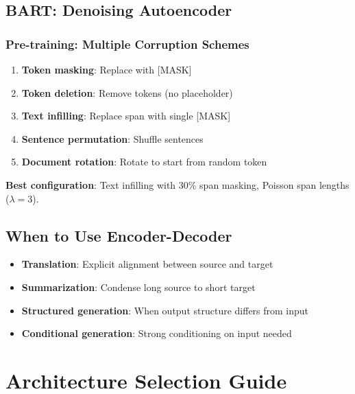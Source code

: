 \subsection{BART: Denoising Autoencoder}

\subsubsection{Pre-training: Multiple Corruption Schemes}

\begin{enumerate}
    \item \textbf{Token masking}: Replace with [MASK]
    \item \textbf{Token deletion}: Remove tokens (no placeholder)
    \item \textbf{Text infilling}: Replace span with single [MASK]
    \item \textbf{Sentence permutation}: Shuffle sentences
    \item \textbf{Document rotation}: Rotate to start from random token
\end{enumerate}

\textbf{Best configuration}: Text infilling with 30\% span masking, Poisson span lengths ($\lambda = 3$).

\subsection{When to Use Encoder-Decoder}

\begin{itemize}
    \item \textbf{Translation}: Explicit alignment between source and target
    \item \textbf{Summarization}: Condense long source to short target
    \item \textbf{Structured generation}: When output structure differs from input
    \item \textbf{Conditional generation}: Strong conditioning on input needed
\end{itemize}

\section{Architecture Selection Guide}
\label{sec:nlp_arch_selection}

